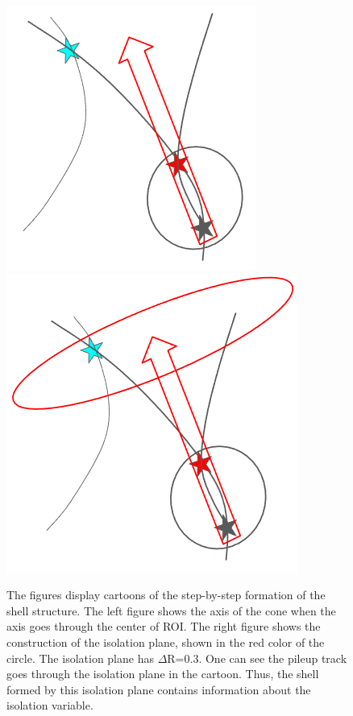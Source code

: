 \begin{figure}[h!]
  \centering
  \includegraphics[width=0.4\linewidth]{figs/MLP4.png}
  \includegraphics[width=0.4\linewidth]{figs/MLP5.png}
\caption{
        The figures display cartoons of the step-by-step formation of the shell structure.
        The left figure shows the axis of the cone when the axis goes through the center of ROI.
        The right figure shows the construction of the isolation plane, shown in the red color of the circle.
        The isolation plane has $\Delta$R=0.3.
        One can see the pileup track goes through the isolation plane in the cartoon.
        Thus, the shell formed by this isolation plane contains information about the isolation variable.
	}
  \label{fig:Clustering}
\end{figure}


